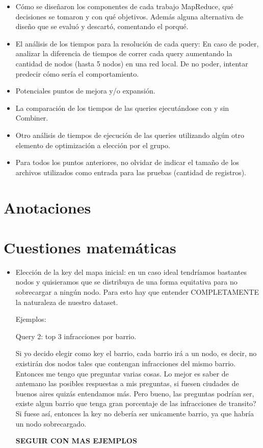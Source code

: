 \documentclass[a4paper,12pt]{article}
\begin{document}
	\begin{itemize}
		\item Cómo se diseñaron los componentes de cada trabajo MapReduce, qué decisiones se tomaron y con qué objetivos. Además alguna alternativa de diseño que se evaluó y descartó, comentando el porqué.
		\item El análisis de los tiempos para la resolución de cada query: En caso de poder, analizar la diferencia de tiempos de correr cada query aumentando la cantidad de nodos (hasta 5 nodos) en una red local. De no poder, intentar predecir cómo sería el comportamiento.
		\item Potenciales puntos de mejora y/o expansión.
		\item La comparación de los tiempos de las queries ejecutándose con y sin Combiner.
		\item Otro análisis de tiempos de ejecución de las queries utilizando algún otro elemento de optimización a elección por el grupo.
		\item Para todos los puntos anteriores, no olvidar de indicar el tamaño de los archivos utilizados como entrada para las pruebas (cantidad de registros).
	\end{itemize}
	
	\section{Anotaciones}
	
	\section{Cuestiones matemáticas}
	
	\begin{itemize}
		\item Elección de la key del mapa inicial: en un caso ideal tendríamos bastantes nodos y quisieramos que se distribuya de una forma equitativa para no sobrecargar a ningún nodo. Para esto hay que entender COMPLETAMENTE la naturaleza de nuestro dataset.
		
		Ejemplos:
		
		Query 2: top 3 infracciones por barrio.
		
		Si yo decido elegir como key el barrio, cada barrio irá a un nodo, es decir, no existirán dos nodos tales que contengan infracciones del mismo barrio. Entonces me tengo que preguntar varias cosas. Lo mejor es saber de antemano las posibles respuestas a mis preguntas, si fuesen ciudades de buenos aires quizás entendamos más. Pero bueno, las preguntas podrían ser, existe algun barrio que tenga gran porcentaje de las infracciones de transito? Si fuese así, entonces la key no debería ser unicamente barrio, ya que habría un nodo sobrecargado.
		
		\textbf{SEGUIR CON MAS EJEMPLOS}
		
		
		
	\end{itemize}
	
\end{document}
